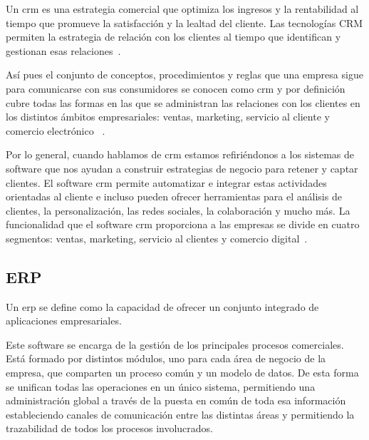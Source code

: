 Un \acrfull{crm} es una estrategia comercial que optimiza los ingresos y la rentabilidad al tiempo que promueve la satisfacción y la lealtad del cliente. Las tecnologías CRM permiten la estrategia de relación con los clientes al tiempo que identifican y gestionan esas relaciones~\cite{GartnerCRM}. 

Así pues el conjunto de conceptos, procedimientos y reglas que una empresa sigue para comunicarse con sus consumidores se conocen como  \acrshort{crm} y por definición cubre todas las formas en las que se administran las relaciones con los clientes en los distintos ámbitos empresariales: ventas, marketing, servicio al cliente y comercio electrónico~\cite{SAP-CRM} . 

Por lo general, cuando hablamos de \acrshort{crm} estamos refiriéndonos a los sistemas de software que nos ayudan a construir estrategias de negocio para retener y captar clientes.
El software \acrfull{crm} permite automatizar e integrar estas actividades orientadas al cliente e incluso pueden ofrecer herramientas para el análisis de clientes, la personalización, las redes sociales, la colaboración y mucho más. La funcionalidad que el software \acrshort{crm} proporciona a las empresas se divide en cuatro segmentos: ventas, marketing, servicio al clientes y comercio digital~\cite{GartnerCRM}. 


\subsection{ERP}
\label{sec:erp}
Un \acrfull{erp} se define como la capacidad de ofrecer un conjunto integrado de aplicaciones empresariales\cite{GartnerERP}. 


Este software se encarga de la gestión de los principales procesos comerciales. Está formado por distintos módulos, uno para cada área de negocio de la empresa, que comparten un proceso común y un modelo de datos. De esta forma se unifican todas las operaciones en un único sistema, permitiendo una administración global a través de la puesta en común de toda esa información estableciendo canales de comunicación entre las distintas áreas y permitiendo la trazabilidad de todos los procesos involucrados. 

